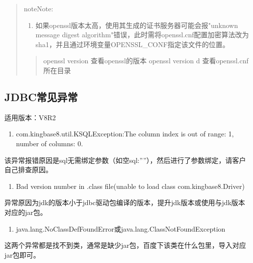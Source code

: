 \documentclass[a4,10pt,oneside,english]{sphinxmanual}
\begin{document}
\begin{quote}
\begin{sphinxadmonition}{note}{Note:}
\begin{enumerate}
\end{enumerate}
\end{sphinxadmonition}
\begin{enumerate}
%
\setcounter{enumi}{3}
\item {} 
如果openssl版本太高，使用其生成的证书服务器可能会报"unknown message digest algorithm"错误，此时需将openssl.cnf配置加密算法改为sha1，并且通过环境变量OPENSSL\_CONF指定该文件的位置。

\end{enumerate}
\begin{quote}

openssl version      查看openssl的版本
openssl version \sphinxhyphen{}d   查看openssl.cnf所在目录
\end{quote}
\end{quote}


\subsection{JDBC常见异常}
\label{\detokenize{interface/jdbc:id14}}
适用版本：V8R2
\begin{enumerate}
%
\item {} 
com.kingbase8.util.KSQLException:The column index is out of range: 1, number of columns: 0.

\end{enumerate}

该异常报错原因是sql无需绑定参数（如空sql:””），然后进行了参数绑定，请客户自己排查原因。
\begin{enumerate}
%
\setcounter{enumi}{1}
\item {} 
Bad version number in .class file(unable to load class com.kingbase8.Driver)

\end{enumerate}

异常原因为jdk的版本小于jdbc驱动包编译的版本，提升jdk版本或使用与jdk版本对应的jar包。
\begin{enumerate}
%
\setcounter{enumi}{2}
\item {} 
java.lang.NoClassDefFoundError或java.lang.ClassNotFoundException

\end{enumerate}

这两个异常都是找不到类，通常是缺少jar包，百度下该类在什么包里，导入对应jar包即可。
\end{document}
